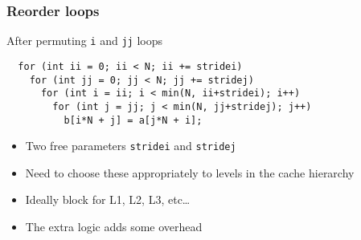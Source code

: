 \documentclass[presentation,aspectratio=43,10pt]{beamer}
\begin{document}
\begin{frame}[fragile]
  \frametitle{Reorder loops}
  \begin{exampleblock}{After permuting \texttt{i} and \texttt{jj} loops}
\begin{verbatim}
  for (int ii = 0; ii < N; ii += stridei)
    for (int jj = 0; jj < N; jj += stridej)
      for (int i = ii; i < min(N, ii+stridei); i++)
        for (int j = jj; j < min(N, jj+stridej); j++)
          b[i*N + j] = a[j*N + i];
\end{verbatim}
  \end{exampleblock}
  \begin{itemize}
  \item Two free parameters \texttt{stridei} and \texttt{stridej}
  \item Need to choose these appropriately to levels in the cache
    hierarchy
  \item Ideally block for L1, L2, L3, etc\dots
  \item The extra logic adds some overhead
  \end{itemize}
\end{frame}
\end{document}
